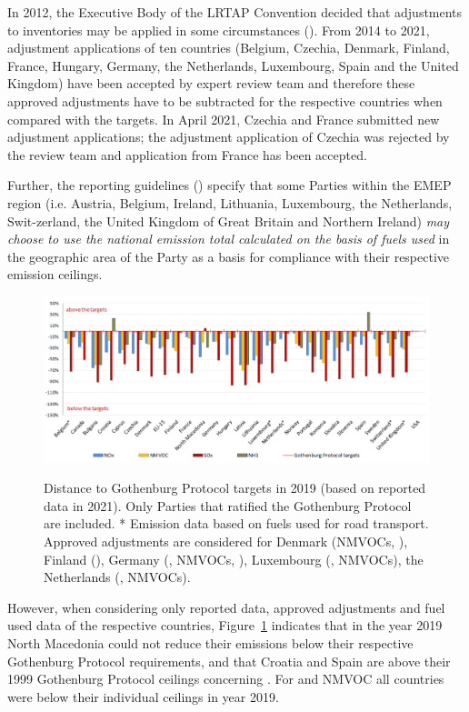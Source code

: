 In 2012, the Executive Body of the LRTAP Convention decided that adjustments to inventories may be applied in some circumstances (\cite{UNECE2012}). From 2014 to 2021, adjustment applications of ten countries (Belgium, Czechia, Denmark, Finland, France, Hungary, Germany, the Netherlands, Luxembourg, Spain and the United Kingdom) have been accepted by expert review team and therefore these approved adjustments have to be subtracted for the respective countries when compared with the targets. In April 2021, Czechia and France  submitted  new adjustment applications; the \nhiii adjustment application  of Czechia was rejected by the review team and application from France has been accepted.     

Further, the reporting guidelines (\cite{UNECE2014}) specify that some Parties within the EMEP region (i.e. Austria, Belgium, Ireland, Lithuania, Luxembourg, the Netherlands, Swit-zerland, the United Kingdom of Great Britain and Northern Ireland) {\it may choose to use the national emission total calculated on the basis of fuels used} in the geographic area of the Party as a basis for compliance with their respective emission ceilings.

\begin{figure}[h]
\centering
{\includegraphics*[viewport=1 1 753 323,clip,scale=0.55]{FIGS_CEIP/Fig4.pdf}}
\caption{Distance to Gothenburg Protocol targets in 2019 (based on reported data in 2021).
  Only Parties that ratified the Gothenburg Protocol are included. 
  * Emission data based on fuels used for road transport.
Approved adjustments are considered for  Denmark (NMVOCs, \nhiii), Finland (\nhiii),  Germany (\nox, NMVOCs, \nhiii), Luxembourg (\nox, NMVOCs), the Netherlands (\nhiii, NMVOCs).}
\label{fig:CEIP4}
\end{figure}

However, when considering only reported data, approved adjustments and fuel used data of the respective countries, Figure~\ref{fig:CEIP4} indicates that in the year 2019 North Macedonia could not reduce their \sox emissions below their respective Gothenburg Protocol requirements, and that Croatia and Spain are above their 1999 Gothenburg Protocol ceilings concerning \nhiii. For \nox and NMVOC all countries were below their individual ceilings in year 2019.



